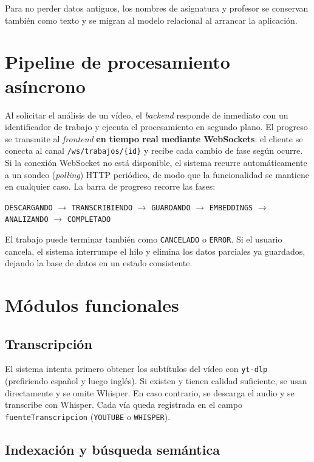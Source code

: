 Para no perder datos antiguos, los nombres de asignatura y profesor se conservan también como
texto y se migran al modelo relacional al arrancar la aplicación.

\section{Pipeline de procesamiento asíncrono}

Al solicitar el análisis de un vídeo, el \textit{backend} responde de inmediato con un
identificador de trabajo y ejecuta el procesamiento en segundo plano. El progreso se transmite
al \textit{frontend} \textbf{en tiempo real mediante WebSockets}: el cliente se conecta al canal
\texttt{/ws/trabajos/\{id\}} y recibe cada cambio de fase según ocurre. Si la conexión WebSocket
no está disponible, el sistema recurre automáticamente a un sondeo (\textit{polling}) HTTP
periódico, de modo que la funcionalidad se mantiene en cualquier caso. La barra de progreso
recorre las fases:

\begin{center}
\texttt{DESCARGANDO} $\rightarrow$ \texttt{TRANSCRIBIENDO} $\rightarrow$ \texttt{GUARDANDO}
$\rightarrow$ \texttt{EMBEDDINGS} $\rightarrow$ \texttt{ANALIZANDO} $\rightarrow$ \texttt{COMPLETADO}
\end{center}

El trabajo puede terminar también como \texttt{CANCELADO} o \texttt{ERROR}. Si el usuario cancela,
el sistema interrumpe el hilo y elimina los datos parciales ya guardados, dejando la base de datos
en un estado consistente.

\section{Módulos funcionales}

\subsection{Transcripción}

El sistema intenta primero obtener los subtítulos del vídeo con \texttt{yt-dlp} (prefiriendo
español y luego inglés). Si existen y tienen calidad suficiente, se usan directamente y se omite
Whisper. En caso contrario, se descarga el audio y se transcribe con Whisper. Cada vía queda
registrada en el campo \texttt{fuenteTranscripcion} (\texttt{YOUTUBE} o \texttt{WHISPER}).

\subsection{Indexación y búsqueda semántica}

